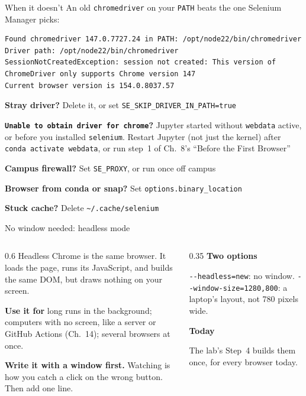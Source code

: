 \documentclass[9pt,aspectratio=169]{beamer}
\begin{document}
\begin{frame}[fragile]{When it doesn't}
    An old \texttt{chromedriver} on your \texttt{PATH} beats the one Selenium Manager picks:
\begin{lstlisting}
Found chromedriver 147.0.7727.24 in PATH: /opt/node22/bin/chromedriver
Driver path: /opt/node22/bin/chromedriver
SessionNotCreatedException: session not created: This version of
ChromeDriver only supports Chrome version 147
Current browser version is 154.0.8037.57
\end{lstlisting}
            \textbf{Stray driver?} Delete it, or set \texttt{SE\_SKIP\_DRIVER\_IN\_PATH=true}

            \smallskip
            \textbf{\texttt{Unable to obtain driver for chrome}?} Jupyter started without \texttt{webdata} active, or before you installed \texttt{selenium}. Restart Jupyter (not just the kernel) after \texttt{conda activate webdata}, or run step~1 of Ch.~8's ``Before the First Browser''

            \smallskip
            \textbf{Campus firewall?} Set \texttt{SE\_PROXY}, or run once off campus

            \smallskip
            \textbf{Browser from conda or snap?} Set \texttt{options.binary\_location}

            \smallskip
            \textbf{Stuck cache?} Delete \texttt{\textasciitilde/.cache/selenium}
\end{frame}

\begin{frame}{No window needed: headless mode}
    \begin{columns}[T]
        \begin{column}{0.6\textwidth}
            Headless Chrome is the same browser. It loads the page, runs its JavaScript, and builds the same DOM, but draws nothing on your screen.

            \medskip
            \textbf{Use it for} long runs in the background; computers with no screen, like a server or GitHub Actions (Ch.~14); several browsers at once.

            \medskip
            \textbf{Write it with a window first.} Watching is how you catch a click on the wrong button. Then add one line.
        \end{column}
        \begin{column}{0.35\textwidth}
            \textbf{Two options}\\[2pt]
            {\footnotesize \texttt{-{}-headless=new}: no window. \texttt{-{}-window-size=1280,800}: a laptop's layout, not 780 pixels wide.\par}
            \medskip
            \textbf{Today}\\[2pt]
            {\footnotesize The lab's Step~4 builds them once, for every browser today.\par}
        \end{column}
    \end{columns}
\end{frame}
\end{document}
